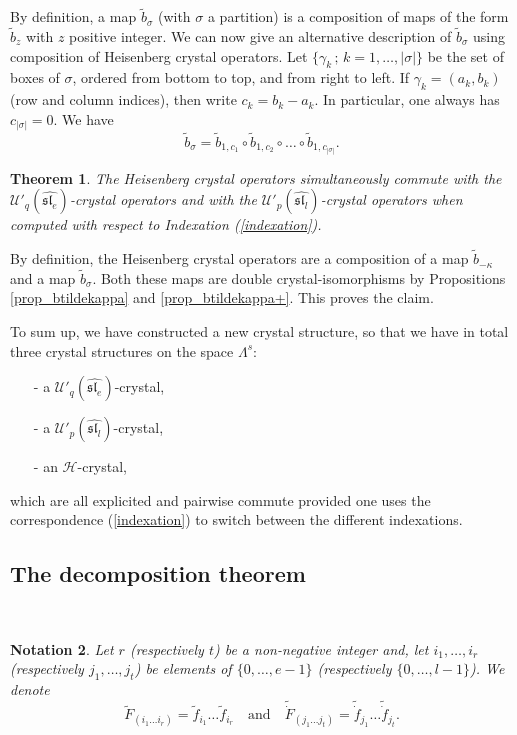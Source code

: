 \documentclass[twoside,12pt]{amsart}
\theoremstyle{plain}
\newcommand{\cH}{\mathcal{H}}
\newcommand{\si}{\sigma}
\newcommand{\ga}{\gamma}
\newcommand{\ka}{\kappa}
\newcommand{\La}{\Lambda}
\newcommand{\tb}{\tilde{b}}
\newcommand{\tf}{\tilde{f}}
\newcommand{\tF}{\tilde{F}}
\newcommand{\tdf}{\tilde{\dot{f}}}
\newcommand{\tdF}{\tilde{\dot{F}}}
\newcommand{\Ue}{\mathcal{U}'_q (\widehat{\mathfrak{sl}_e})}
\newcommand{\Ul}{\mathcal{U}'_p (\widehat{\mathfrak{sl}_l})}
\newcommand{\mand}{\quad\text{and}\quad}
\newtheorem{num}{Notation}[section]
\newtheorem{thm}[num]{Theorem}
\theoremstyle{remark}
\begin{document}
\medskip

By definition, a map $\tb_{\si}$ (with $\si$ a partition) 
is a composition of maps of the form $\tb_{z}$ with $z$ positive integer.
We can now give an alternative description of $\tb_{\si}$ using composition of
Heisenberg crystal operators.
Let $\{ \ga_k \, ; \, k=1,\dots,|\si|\}$ be the set of boxes of $\si$, ordered from bottom
to top, and from right to left. If $\ga_k=(a_k,b_k)$ (row and column indices),
then write $c_k = b_k-a_k$. 
In particular, one always has $c_{|\si|}=0$.
We have
\begin{equation}\label{heis_dec}
\tb_{\si} = \tb_{1,c_1}\circ \tb_{1,c_2}\circ \dots \circ\tb_{1,c_{|\si|}}.
\end{equation}


\begin{thm}\label{thm_heis_op}
The Heisenberg crystal operators simultaneously commute with the $\Ue$-crystal operators
and with the $\Ul$-crystal operators when computed with respect to Indexation (\ref{indexation}).
\end{thm}

\proof
By definition, the Heisenberg crystal operators are a composition of a map $\tb_{-\ka}$ and a map $\tb_{\si}$.
Both these maps are double crystal-isomorphisms by Propositions \ref{prop_btildekappa} and \ref{prop_btildekappa+}.
This proves the claim.
\endproof

To sum up, we have constructed a new crystal structure, so that we have in total three crystal structures on
the space $\La^s$:
\begin{itemize}
 \item[-] a $\Ue$-crystal,
\item[-] a $\Ul$-crystal,
\item[-] an $\cH$-crystal,
\end{itemize}
which are all explicited and pairwise commute
provided one uses the correspondence (\ref{indexation}) to switch between the different indexations.


\subsection{The decomposition theorem}\label{crys_decomp}\


\begin{num}
Let $r$ (respectively $t$) be a non-negative integer and, 
let $i_1,\dots,i_r$ (respectively $j_1,\dots,j_t$) be elements of $\{0,\dots,e-1\}$ (respectively $\{0,\dots,l-1\}$).
We denote
$$\tF_{(i_1 \dots i_r)} = \tf_{i_1}\dots\tf_{i_r} \mand \tdF_{(j_1 \dots j_t)} = \tdf_{j_1}\dots\tdf_{j_t}.$$ 
\end{num}
\end{document}
